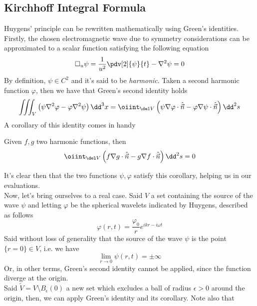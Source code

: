 \documentclass[../electromagnetism.tex]{subfiles}
\begin{document}
\subsection{Kirchhoff Integral Formula}
Huygens' principle can be rewritten mathematically using Green's identities.\\
Firstly, the chosen electromagnetic wave due to symmetry considerations can be approximated to a scalar function satisfying the following equation
\begin{equation}
	\square_u\psi=\frac{1}{u^2}\pdv[2]{\psi}{t}-\nabla^2\psi=0
	\label{eq:dalamberteq.diff}
\end{equation}
By definition, $\psi\in C^2$ and it's said to be \textit{harmonic}. Taken a second harmonic function $\varphi$, then we have that Green's second identity holds
\begin{equation}
	\iiint_V\left( \psi\nabla^2\varphi-\varphi\nabla^2\psi \right)\dd^3x=\oiint_{\del V}\left( \psi\nabla\varphi\cdot\hat{\vec{n}}-\varphi\nabla\psi\cdot\hat{\vec{n}} \right)\dd^2s
	\label{eq:green2.diff}
\end{equation}
A corollary of this identity comes in handy
\begin{cor}
	Given $f, g$ two harmonic functions, then
	\begin{equation}
		\oiint_{\del V}\left( f\nabla g\cdot\hat{\vec{n}}-g\nabla f\cdot\hat{\vec{n}} \right)\dd^2s=0
		\label{eq:corgreen.diff}
	\end{equation}
\end{cor}
It's clear then that the two functions $\psi,\varphi$ satisfy this corollary, helping us in our evaluations.\\
Now, let's bring ourselves to a real case. Said $V$ a set containing the source of the wave $\psi$ and letting $\varphi$ be the spherical wavelets indicated by Huygens, described as follows
\begin{equation}
	\varphi(r, t)=\frac{\varphi_0}{r}e^{ikr-i\omega t}
	\label{eq:huygenswavelets.diff}
\end{equation}
Said without loss of generality that the source of the wave $\psi$ is the point $\{r=0\}\in V$, i.e. we have
\begin{equation*}
	\lim_{r\to0}\psi(r, t)=\pm\infty
\end{equation*}
Or, in other terms, Green's second identity cannot be applied, since the function diverge at the origin.\\
Said $\tilde{V}=V\setminus B_\epsilon(0)$ a new set which excludes a ball of radius $\epsilon>0$ around the origin, then, we can apply Green's identity and its corollary. Note also that 
\end{document}
